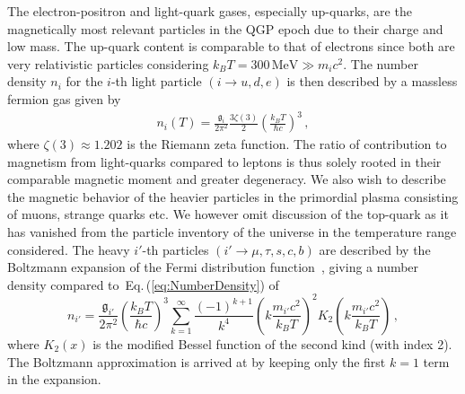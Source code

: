 \documentclass[epjST]{svjour}
\newcommand{\req}[1]{Eq.\,(\ref{#1})}
\begin{document}
The electron-positron and light-quark gases, especially up-quarks, are the magnetically most relevant particles in the QGP epoch due to their charge and low mass. The up-quark content is comparable to that of electrons since both are very relativistic particles considering \(k_{B}T=300\,\mathrm{MeV}\gg m_i c^{2}\). {\color{blue}The number density \(n_{i}\) for the \(i\)-th light particle \((i\rightarrow u,d,e)\) is then described by a massless fermion gas given by~\cite{Letessier:2002ony}
\begin{align}
\label{eq:NumberDensity}
n_{i}(T) = \frac{\mathfrak{g}_{i}}{2\pi^{2}}\frac{3\zeta(3)}{2}\left(\frac{k_{B}T}{\hbar c}\right)^{3}\,,
\end{align}
}where \(\zeta(3)\approx1.202\) is the Riemann zeta function. The ratio of contribution to magnetism from light-quarks compared to leptons is thus solely rooted in their comparable magnetic moment and greater degeneracy. {\color{blue} We also wish to describe the magnetic behavior of the heavier particles in the primordial plasma consisting of muons, strange quarks etc. We however omit discussion of the top-quark as it has vanished from the particle inventory of the universe in the temperature range considered. The heavy \(i'\)-th particles \((i'\rightarrow \mu,\tau,s,c,b)\) are described by the Boltzmann expansion of the Fermi distribution function~\cite{Letessier:2002ony,Yang:2024ret}, giving a number density compared to~\req{eq:NumberDensity} of
\begin{equation}
 \label{eq:HeavyNumberDensity}
 n_{i'} = \frac{\mathfrak{g}_{i'}}{2\pi^{2}}\left(\frac{k_{B}T}{\hbar c}\right)^{3}\sum_{k=1}^{\infty}\frac{(-1)^{k+1}}{k^4}\left(k\frac{m_{i'}c^{2}}{k_{B}T}\right)^{2}K_{2}\left(k\frac{m_{i'}c^{2}}{k_{B}T}\right)\,,
\end{equation}
where \(K_{2}(x)\) is the modified Bessel function of the second kind (with index 2). The Boltzmann approximation is arrived at by keeping only the first \(k=1\) term in the expansion.}
\end{document}
